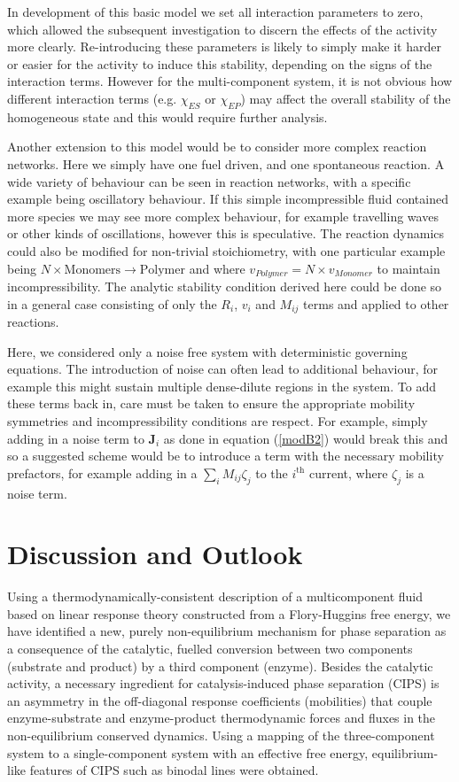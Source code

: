 In development of this basic model we set all interaction parameters to zero, which allowed the subsequent investigation to discern the effects of the activity more clearly. Re-introducing these parameters is likely to simply make it harder or easier for the activity to induce this stability, depending on the signs of the interaction terms. However for the multi-component system, it is not obvious how different interaction terms (e.g. $\chi_{ES}$  or $\chi_{EP}$) may affect the overall stability of the homogeneous state and this would require further analysis. 

Another extension to this model would be to consider more complex reaction networks. Here we simply have one fuel driven, and one spontaneous reaction. A wide variety of behaviour can be seen in reaction networks, with a specific example being oscillatory behaviour. If this simple incompressible fluid contained more species we may see more complex behaviour, for example travelling waves or other kinds of oscillations, however this is speculative. The reaction dynamics could also be modified for non-trivial stoichiometry, with one particular example being $N \times \text{Monomers} \rightarrow \text{Polymer}$ and where $v_{Polymer} = N \times v_{Monomer}$ to maintain incompressibility. The analytic stability condition derived here could be done so in a general case consisting of only the $R_i$, $v_i$ and $M_{ij}$ terms and applied to other reactions.

Here, we considered only a noise free system with deterministic governing equations. The introduction of noise can often lead to additional behaviour, for example this might sustain multiple dense-dilute regions in the system. To add these terms back in, care must be taken to ensure the appropriate mobility symmetries and incompressibility conditions are respect. For example, simply adding in a noise term to $\textbf{J}_i$ as done in equation (\ref{modB2}) would break this and so a suggested scheme would be to introduce a term with the necessary mobility prefactors, for example  adding in a $\sum_i M_{ij}\zeta_j$ to the $i^{\text{th}}$ current, where $\zeta_j$ is a noise term.

\section{Discussion and Outlook}

Using a thermodynamically-consistent description of a multicomponent fluid based on linear response theory constructed from a Flory-Huggins free energy, we have identified a new, purely non-equilibrium mechanism for phase separation as a consequence of the catalytic, fuelled conversion between two components (substrate and product) by a third component (enzyme). Besides the catalytic activity, a necessary ingredient for catalysis-induced phase separation (CIPS) is an asymmetry in the off-diagonal response coefficients (mobilities) that couple enzyme-substrate and enzyme-product thermodynamic forces and fluxes in the non-equilibrium conserved dynamics. Using a mapping of the three-component system to a single-component system with an effective free energy, equilibrium-like features of CIPS such as binodal lines were obtained.


